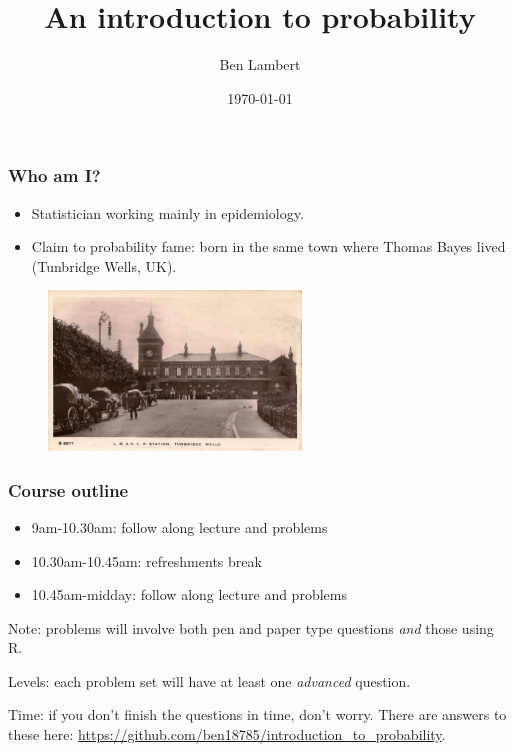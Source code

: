 \documentclass{beamer}
\title[Intro to probability]{An introduction to probability} %
\author{Ben Lambert} %
\institute[Univ. of Oxford] %
{
	University of Oxford \\ %
	\medskip
	\textit{ben.c.lambert@gmail.com} %
}
\date{\today} %
\begin{document}
	
	\begin{frame}
		\titlepage %
	\end{frame}

	\begin{frame}
		\frametitle{Who am I?}
		
		\begin{itemize}
			\item Statistician working mainly in epidemiology.
			\item Claim to probability fame: born in the same town where Thomas Bayes lived (Tunbridge Wells, UK).
		\end{itemize}
		
		\begin{figure}[ht]
			\centerline{\includegraphics[width=0.6\textwidth]{./figures/tunbridgeWells.jpg}}
		\end{figure}
		
	\end{frame}

	\begin{frame}
		\frametitle{Course outline}
		
		\begin{itemize}
			\item 9am-10.30am: follow along lecture and problems
			\item 10.30am-10.45am: refreshments break
			\item 10.45am-midday: follow along lecture and problems
		\end{itemize}
		
		\vspace{0.5cm}
		
		Note: problems will involve both pen and paper type questions \textit{and} those using R.
		
		Levels: each problem set will have at least one \textit{advanced} question.
		
		Time: if you don't finish the questions in time, don't worry. There are answers to these here: \url{https://github.com/ben18785/introduction_to_probability}.
		
	\end{frame}
\end{document}
